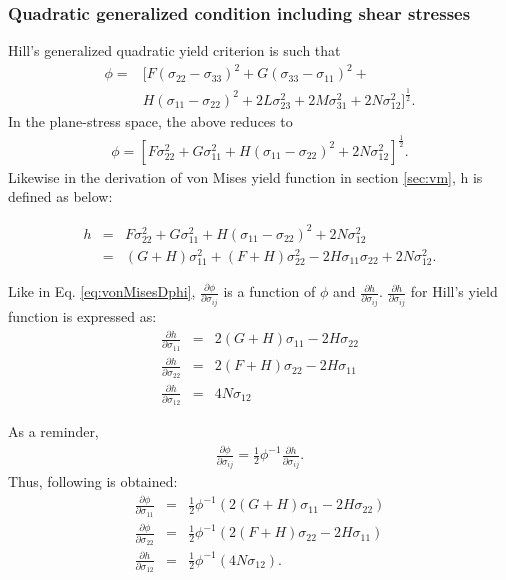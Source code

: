 \documentclass[12pt]{amsart}
\begin{document}
\subsubsection{Quadratic generalized condition including shear stresses}
Hill's generalized quadratic yield criterion is such that
\begin{equation}
  \label{eq:hillgenquad}
  \begin{aligned}
    \phi =& [F(\sigma_{22}-\sigma_{33})^2+G(\sigma_{33}-\sigma_{11})^2+\\
          &H(\sigma_{11}-\sigma_{22})^2+2L\sigma_{23}^2+2M\sigma_{31}^2+2N\sigma_{12}^2]^\frac{1}{2}.
  \end{aligned}
\end{equation}
In the plane-stress space, the above reduces to
\begin{equation}
  \label{eq:hillgenquad}
  \begin{aligned}
    \phi = [F\sigma_{22}^2+G\sigma_{11}^2+H(\sigma_{11}-\sigma_{22})^2+2N\sigma_{12}^2]^\frac{1}{2}.
  \end{aligned}
\end{equation}
Likewise in the derivation of von Mises yield function in section \ref{sec:vm}, h is defined as below:

\begin{eqnarray}
  \label{eq:hill48H}
  h&=&F\sigma_{22}^2+G\sigma_{11}^2+H(\sigma_{11}-\sigma_{22})^2+2N\sigma_{12}^2\\
   &=&(G+H)\sigma_{11}^2+(F+H)\sigma_{22}^2-2H\sigma_{11}\sigma_{22}+2N\sigma_{12}^2.
\end{eqnarray}

Like in Eq. \ref{eq:vonMisesDphi},  $\frac{\partial \phi}{\partial\sigma_{ij}}$ is a function of $\phi$ and $\frac{\partial h}{\partial \sigma_{ij}}$.
$\frac{\partial h}{\partial \sigma_{ij}}$ for Hill's yield function is expressed as:
\begin{eqnarray}
  \label{eq:h_Hill48}
  \frac{\partial h}{\partial \sigma_{11}}&=&2(G+H)\sigma_{11} -2H\sigma_{22}  \\
  \frac{\partial h}{\partial \sigma_{22}}&=&2(F+H)\sigma_{22} -2H\sigma_{11}   \\
  \frac{\partial h}{\partial \sigma_{12}}&=&4N\sigma_{12}
\end{eqnarray}

As a reminder,
\begin{eqnarray}
  \label{eq:vmdphi_gen}
  \frac{\partial \phi}{\partial\sigma_{ij}}=\frac{1}{2}\phi^{-1} \frac{\partial h}{\partial \sigma_{ij}}.
\end{eqnarray}
Thus, following is obtained:
\begin{eqnarray}
  \label{eq:vmdphi_components}
  \frac{\partial \phi}{\partial\sigma_{11}}&=&\frac{1}{2}\phi^{-1} (2(G+H)\sigma_{11} -2H\sigma_{22} )\\
  \frac{\partial \phi}{\partial\sigma_{22}}&=&\frac{1}{2}\phi^{-1} (2(F+H)\sigma_{22} -2H\sigma_{11} )\\
  \frac{\partial    h}{\partial\sigma_{12}}&=&\frac{1}{2}\phi^{-1} (4N\sigma_{12}).
\end{eqnarray}
\end{document}
